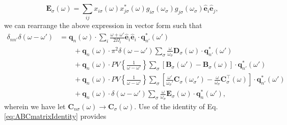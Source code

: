 \begin{equation}
\mathbf{E}_\sigma(\omega) = \sum_{ij}x_{i\sigma}(\omega)x_{j\sigma}^*(\omega)g_{i\sigma}(\omega_\sigma)g_{j\sigma}(\omega_\sigma)\hat{\mathbf{e}}_i\hat{\mathbf{e}}_j,
\end{equation}
we can rearrange the above expression in vector form such that
\begin{equation}
\begin{split}
\delta_{nn'}\delta(\omega - \omega') &= \mathbf{q}_n(\omega)\cdot\sum_{i}\frac{\omega + \omega'}{2\Omega_i}\hat{\mathbf{e}}_i\hat{\mathbf{e}}_i\cdot\mathbf{q}_{n'}^*(\omega')\\
&\qquad + \mathbf{q}_n(\omega)\cdot\pi^2\delta(\omega - \omega')\sum_\sigma\frac{\omega}{\omega_\sigma}\mathbf{D}_\sigma(\omega)\cdot\mathbf{q}_{n'}^*(\omega')\\
&\qquad + \mathbf{q}_n(\omega)\cdot PV\left\{\frac{1}{\omega - \omega'}\right\}\sum_\sigma\left[\mathbf{B}_\sigma(\omega') - \mathbf{B}_\sigma(\omega)\right]\cdot\mathbf{q}_{n'}^*(\omega')\\
&\qquad + \mathbf{q}_{n}(\omega)\cdot PV\left\{\frac{1}{\omega - \omega'}\right\}\sum_\sigma\left[\frac{\omega'}{\omega_\sigma'}\mathbf{C}_\sigma(\omega_\sigma') - \frac{\omega}{\omega_\sigma}\mathbf{C}_\sigma^\top(\omega)\right]\cdot\mathbf{q}_{n'}^*(\omega')\\
&\qquad + \mathbf{q}_n(\omega)\cdot\delta(\omega - \omega')\sum_\sigma\frac{\omega}{\omega_\sigma}\mathbf{E}_\sigma(\omega)\cdot\mathbf{q}_n^*(\omega'),
\end{split}
\end{equation}
wherein we have let $\mathbf{C}_{n\sigma}(\omega)\to\mathbf{C}_\sigma(\omega)$. Use of the identity of Eq. \eqref{eq:ABCmatrixIdentity} provides
